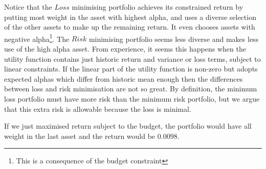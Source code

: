 \documentclass[12pt]{article}
\begin{document}
\break
Notice that the $Loss$ minimising portfolio achieves its constrained return by putting most weight in the
asset with highest alpha, and uses a diverse selection of the other assets to make up the remaining 
return. It even chooses assets with negative alpha\footnote{This is a consequence of the budget constraint}. 
The $Risk$ minimising portfolio seems less diverse and makes less use of the high alpha asset.
From experience, it seems this happens when the utility function contains just historic return and variance or loss terms,
subject to linear constraints. If the linear part of the utility function is non-zero but adopts expected alphas which differ from historic mean 
enough then the differences between loss and risk minimisation are not so great.
By definition, the minimum loss 
portfolio must have more risk than the minimum risk portfolio, but we argue that this extra risk is allowable 
because the loss is minimal.

If we just maximised return subject to the budget, the portfolio would have all weight in the last 
asset and the return would be $0.0098$.
\end{document}
